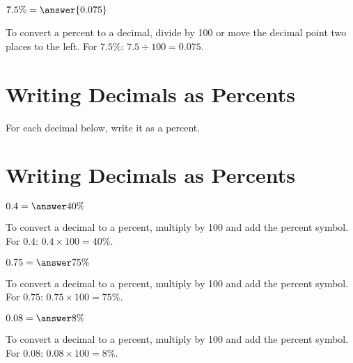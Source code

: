 \documentclass{ximera}
\begin{document}
\begin{problem}
$7.5\% = \answer{0.075}$

\begin{feedback}
To convert a percent to a decimal, divide by 100 or move the decimal point two places to the left. For $7.5\%$: $7.5 \div 100 = 0.075$.
\end{feedback}

\end{problem}



\section*{Writing Decimals as Percents}

For each decimal below, write it as a percent.

\section*{Writing Decimals as Percents}

\begin{problem}
$0.4 = \answer{40\%}$

\begin{feedback}
To convert a decimal to a percent, multiply by 100 and add the percent symbol. For $0.4$: $0.4 \times 100 = 40\%$.
\end{feedback}

\end{problem}

\begin{problem}
$0.75 = \answer{75\%}$

\begin{feedback}
To convert a decimal to a percent, multiply by 100 and add the percent symbol. For $0.75$: $0.75 \times 100 = 75\%$.
\end{feedback}

\end{problem}

\begin{problem}
$0.08 = \answer{8\%}$

\begin{feedback}
To convert a decimal to a percent, multiply by 100 and add the percent symbol. For $0.08$: $0.08 \times 100 = 8\%$.
\end{feedback}

\end{problem}
\end{document}
